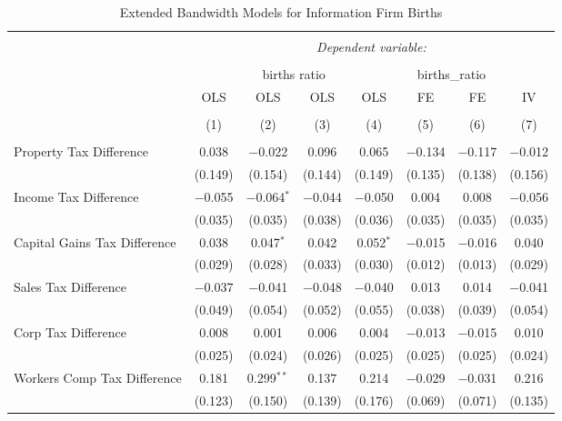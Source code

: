 
\begin{table}[!htbp] \centering 
  \caption{Extended Bandwidth Models for  Information Firm Births} 
  \label{} 
\begin{tabular}{@{\extracolsep{5pt}}lccccccc} 
\\[-1.8ex]\hline 
\hline \\[-1.8ex] 
 & \multicolumn{7}{c}{\textit{Dependent variable:}} \\ 
\cline{2-8} 
\\[-1.8ex] & \multicolumn{4}{c}{births ratio} & \multicolumn{2}{c}{births\_ratio} &   \\ 
 & OLS & OLS & OLS & OLS & FE & FE & IV \\ 
\\[-1.8ex] & (1) & (2) & (3) & (4) & (5) & (6) & (7)\\ 
\hline \\[-1.8ex] 
 Property Tax Difference & 0.038 & $-$0.022 & 0.096 & 0.065 & $-$0.134 & $-$0.117 & $-$0.012 \\ 
  & (0.149) & (0.154) & (0.144) & (0.149) & (0.135) & (0.138) & (0.156) \\ 
  Income Tax Difference & $-$0.055 & $-$0.064$^{*}$ & $-$0.044 & $-$0.050 & 0.004 & 0.008 & $-$0.056 \\ 
  & (0.035) & (0.035) & (0.038) & (0.036) & (0.035) & (0.035) & (0.035) \\ 
  Capital Gains Tax Difference & 0.038 & 0.047$^{*}$ & 0.042 & 0.052$^{*}$ & $-$0.015 & $-$0.016 & 0.040 \\ 
  & (0.029) & (0.028) & (0.033) & (0.030) & (0.012) & (0.013) & (0.029) \\ 
  Sales Tax Difference & $-$0.037 & $-$0.041 & $-$0.048 & $-$0.040 & 0.013 & 0.014 & $-$0.041 \\ 
  & (0.049) & (0.054) & (0.052) & (0.055) & (0.038) & (0.039) & (0.054) \\ 
  Corp Tax Difference & 0.008 & 0.001 & 0.006 & 0.004 & $-$0.013 & $-$0.015 & 0.010 \\ 
  & (0.025) & (0.024) & (0.026) & (0.025) & (0.025) & (0.025) & (0.024) \\ 
  Workers Comp Tax Difference & 0.181 & 0.299$^{**}$ & 0.137 & 0.214 & $-$0.029 & $-$0.031 & 0.216 \\ 
  & (0.123) & (0.150) & (0.139) & (0.176) & (0.069) & (0.071) & (0.135) \\ 

\end{tabular}
\end{table}
